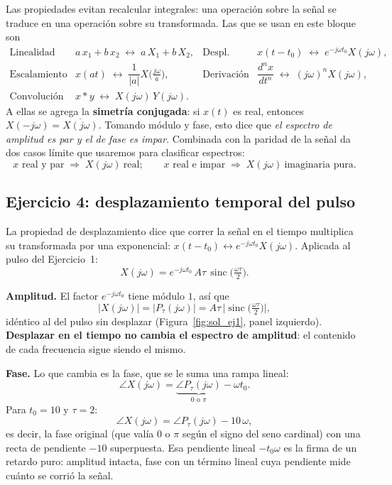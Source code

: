 \documentclass[10pt,a4paper]{article}
\begin{document}
	Las propiedades evitan recalcular integrales: una operación sobre la señal se traduce en una operación sobre su transformada. Las que se usan en este bloque son
	\[
		\begin{array}{llll}
			\text{Linealidad} & a\,x_1+b\,x_2 \;\leftrightarrow\; a\,X_1 + b\,X_2,
			& \text{Despl.\ temporal} & x(t-t_0) \;\leftrightarrow\; e^{-j\omega t_0}X(j\omega), \\[4pt]
			\text{Escalamiento} & x(at) \;\leftrightarrow\; \dfrac{1}{|a|}X\!\big(\tfrac{j\omega}{a}\big),
			& \text{Derivación} & \dfrac{d^n x}{dt^n} \;\leftrightarrow\; (j\omega)^n X(j\omega), \\[8pt]
			\text{Convolución} & x*y \;\leftrightarrow\; X(j\omega)\,Y(j\omega). & &
		\end{array}
	\]
	A ellas se agrega la \textbf{simetría conjugada}: si $x(t)$ es real, entonces $X(-j\omega)=\overline{X(j\omega)}$. Tomando módulo y fase, esto dice que \emph{el espectro de amplitud es par y el de fase es impar}. Combinada con la paridad de la señal da dos casos límite que usaremos para clasificar espectros:
	\[
		x \text{ real y par} \;\Rightarrow\; X(j\omega)\ \text{real};
		\qquad
		x \text{ real e impar} \;\Rightarrow\; X(j\omega)\ \text{imaginaria pura}.
	\]

	\subsection*{Ejercicio 4: desplazamiento temporal del pulso}

	La propiedad de desplazamiento dice que correr la señal en el tiempo multiplica su transformada por una exponencial: $x(t-t_0)\leftrightarrow e^{-j\omega t_0}X(j\omega)$. Aplicada al pulso del Ejercicio~1:
	\[
		\boxed{X(j\omega) = e^{-j\omega t_0}\,A\tau\,\operatorname{sinc}\!\Big(\tfrac{\omega\tau}{2}\Big).}
	\]

	\textbf{Amplitud.} El factor $e^{-j\omega t_0}$ tiene módulo $1$, así que
	\[
		|X(j\omega)| = |P_\tau(j\omega)| = A\tau\,\Big|\!\operatorname{sinc}\!\Big(\tfrac{\omega\tau}{2}\Big)\Big|,
	\]
	idéntico al del pulso sin desplazar (Figura~\ref{fig:sol_ej1}, panel izquierdo). \textbf{Desplazar en el tiempo no cambia el espectro de amplitud}: el contenido de cada frecuencia sigue siendo el mismo.

	\textbf{Fase.} Lo que cambia es la fase, que se le suma una rampa lineal:
	\[
		\angle X(j\omega) = \underbrace{\angle P_\tau(j\omega)}_{0 \text{ o } \pi} - \omega t_0.
	\]
	Para $t_0=10$ y $\tau=2$:
	\[
		\boxed{\angle X(j\omega) = \angle P_\tau(j\omega) - 10\,\omega,}
	\]
	es decir, la fase original (que valía $0$ o $\pi$ según el signo del seno cardinal) con una recta de pendiente $-10$ superpuesta. Esa pendiente lineal $-t_0\omega$ es la firma de un retardo puro: amplitud intacta, fase con un término lineal cuya pendiente mide cuánto se corrió la señal.
\end{document}
